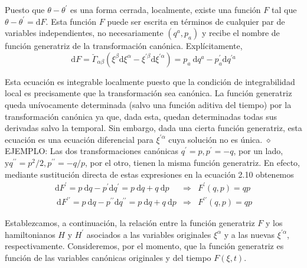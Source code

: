 Puesto que $\theta-\theta^{\prime}$ es una forma cerrada, localmente, existe una función $F$ tal que $\theta-\theta^{\prime}=\mathrm{d} F$. Esta función $F$ puede ser escrita en términos de cualquier par de variables independientes, no necesariamente $\left(q^{a}, p_{a}\right)$ y recibe el nombre de función generatriz de la transformación canónica. Explícitamente,
$$
\begin{equation*}
\mathrm{d} F=\breve{\Gamma}_{\alpha \beta}\left(\xi^{\beta} \mathrm{d} \xi^{\alpha}-\xi^{\prime \beta} \mathrm{d} \xi^{\prime \alpha}\right)=p_{a} \mathrm{~d} q^{a}-p_{a}^{\prime} \mathrm{d} q^{\prime a} \tag{2.10}
\end{equation*}
$$

Esta ecuación es integrable localmente puesto que la condición de integrabilidad local es precisamente que la transformación sea canónica. La función generatriz queda unívocamente determinada (salvo una función aditiva del tiempo) por la transformación canónica ya que, dada esta, quedan determinadas todas sus derivadas salvo la temporal. Sin embargo, dada una cierta función generatriz, esta ecuación es una ecuación diferencial para $\xi^{\prime \alpha}$ cuya solución no es única.
$\diamond$ EJEMPLO: Las dos transformaciones canónicas $q^{\prime}=p, p^{\prime}=-q$, por un lado, $\mathrm{y} q^{\prime \prime}=p^{2} / 2, p^{\prime \prime}=-q / p$, por el otro, tienen la misma función generatriz. En efecto, mediante sustitución directa de estas expresiones en la ecuación 2.10 obtenemos
$$
\begin{array}{lll}
\mathrm{d} F^{\prime}=p \mathrm{~d} q-p^{\prime} \mathrm{d} q^{\prime}=p \mathrm{~d} q+q \mathrm{~d} p & \Rightarrow & F^{\prime}(q, p)=q p \\
\mathrm{~d} F^{\prime \prime}=p \mathrm{~d} q-p^{\prime \prime} \mathrm{d} q^{\prime \prime}=p \mathrm{~d} q+q \mathrm{~d} p & \Rightarrow & F^{\prime \prime}(q, p)=q p
\end{array}
$$

Establezcamos, a continuación, la relación entre la función generatriz $F$ y los hamiltonianos $H$ y $H^{\prime}$ asociados a las variables originales $\xi^{\alpha}$ y a las nuevas $\xi^{\prime \alpha}$, respectivamente. Consideremos, por el momento, que la función generatriz es función de las variables canónicas originales y del tiempo $F(\xi, t)$.

